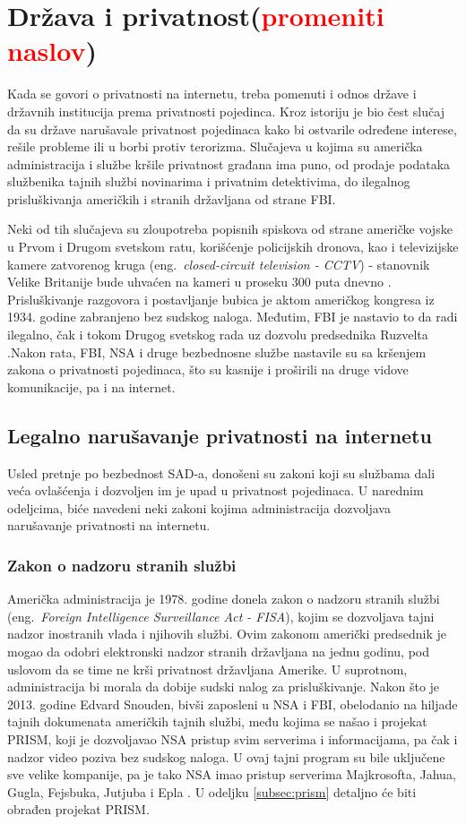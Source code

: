 \documentclass[a4paper]{article}
\newcommand\todos[1]{\textcolor{red}{#1}}
\begin{document}
\section{Država i privatnost(\todos{promeniti naslov})}	
\label{sec:drugoPoglavlje}
Kada se govori o privatnosti na internetu, treba pomenuti i odnos države i državnih institucija prema privatnosti pojedinca. Kroz istoriju je bio čest slučaj da su države narušavale privatnost pojedinaca kako bi ostvarile određene interese, rešile probleme ili u borbi protiv terorizma. Slučajeva u kojima su američka administracija i službe kršile privatnost građana ima puno, od prodaje podataka službenika tajnih službi novinarima i privatnim detektivima, do ilegalnog prisluškivanja američkih i stranih državljana od strane FBI. \par Neki od tih slučajeva su zloupotreba popisnih spiskova od strane američke vojske u Prvom i Drugom svetskom ratu, korišćenje policijskih dronova, kao i televizijske kamere zatvorenog kruga (eng.~{\em closed-circuit television - CCTV}) - stanovnik Velike Britanije bude uhvaćen na kameri u proseku 300 puta dnevno \cite{ethics, london}. Prisluškivanje razgovora i postavljanje bubica je aktom američkog kongresa iz 1934. godine zabranjeno bez sudskog naloga. Međutim, FBI je nastavio to da radi ilegalno, čak i tokom Drugog svetskog rada uz dozvolu predsednika Ruzvelta \cite{ruzvelt}.Nakon rata, FBI, NSA i druge bezbednosne službe nastavile su sa kršenjem zakona o privatnosti pojedinaca, što su kasnije i proširili na druge vidove komunikacije, pa i na internet.

\subsection{Legalno narušavanje privatnosti na internetu}
\label{subsec:zakoni}
Usled pretnje po bezbednost SAD-a, donošeni su zakoni koji su službama dali veća ovlašćenja i dozvoljen im je upad u privatnost pojedinaca. U narednim odeljcima, biće navedeni neki zakoni kojima administracija dozvoljava narušavanje privatnosti na internetu.

\subsubsection{Zakon o nadzoru stranih službi}
Američka administracija je 1978. godine donela zakon o nadzoru stranih službi (eng.~{\em Foreign Intelligence Surveillance Act - FISA}),  kojim se dozvoljava tajni nadzor inostranih vlada i njihovih službi. Ovim zakonom američki predsednik je mogao da odobri elektronski nadzor stranih državljana na jednu godinu, pod uslovom da se time ne krši privatnost državljana Amerike. U suprotnom, administracija bi morala da dobije sudski nalog za prisluškivanje. Nakon što je 2013. godine Edvard Snouden, bivši zaposleni u NSA i FBI, obelodanio na hiljade tajnih dokumenata američkih tajnih službi, među kojima se našao i projekat PRISM, koji je dozvoljavao NSA pristup svim serverima i informacijama, pa čak i nadzor video poziva bez sudskog naloga. U ovaj tajni program su bile uključene sve velike kompanije, pa je tako NSA imao pristup serverima Majkrosofta, Jahua, Gugla, Fejsbuka, Jutjuba i Epla \cite{kompanije}. U odeljku \ref{subsec:prism} detaljno će biti obrađen projekat PRISM.
\end{document}
